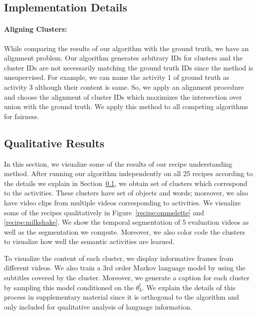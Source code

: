 \subsection{Implementation Details}
\label{imp_det}

\paragraph{Aligning Clusters:} While comparing the results of our algorithm with the ground truth, we have an alignment problem. Our algorithm generates arbitrary IDs for clusters and the cluster IDs are not necessarily matching the ground truth IDs since the method is unsupervised. For example, we can name the activity 1 of ground truth as activity 3 although their content is same. So, we apply an alignment procedure and choose the alignment of cluster IDs which maximizes the intersection over union with the ground truth. We apply this method to all competing algorithms for fairness.

\subsection{Qualitative Results}
In this section, we visualize some of  the results of our recipe understanding method. After running our algorithm independently on all 25 recipes according to the details we explain in Section~\ref{imp_det}, we obtain set of clusters which correspond to the activities. These clusters have set of objects and words; moreover, we also have video clips from multiple videos corresponding to activities. We visualize some of the recipes qualitatively in Figure~\ref{recipe:ommelette} and \ref{recipe:milkshake}. We show the temporal segmentation of 5 evaluation videos as well as the segmentation we compute. Moreover, we also color code the clusters to visualize how well the semantic activities are learned.

To visualize the content of each cluster, we display informative frames from different videos. We also train a 3rd order Markov language model\cite{languageModel} by using the subtitles covered by the cluster. Moreover, we generate a caption for each cluster by sampling this model conditioned on the $\theta^l_k$. We explain the details of this process in supplementary material since it is orthogonal to the algorithm and only included for qualitative analysis of language information.

